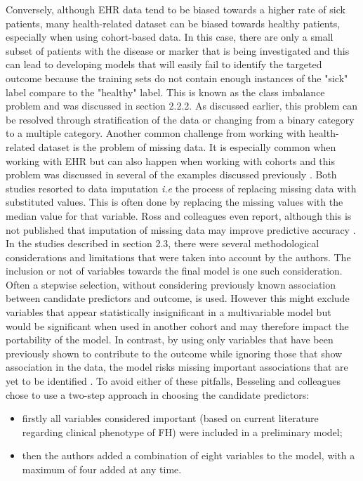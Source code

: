 Conversely, although EHR data tend to be biased towards a higher rate of sick patients, many health-related dataset can be biased towards healthy patients, especially when using cohort-based data. In this case, there are only a small subset of patients with the disease or marker that is being investigated and this can lead to developing models that will easily fail to identify the targeted outcome because the training sets do not contain enough instances of the "sick" label compare to the "healthy" label. This is known as the class imbalance problem and was discussed in section 2.2.2. 
As discussed earlier, this problem can be resolved through stratification of the data or changing from a binary category to a multiple category.
Another common challenge from working with health-related dataset is the problem of missing data. It is especially common when working with EHR \citep{Goldstein:2017bk} but can also happen when working with cohorts and this problem was discussed in several of the examples discussed previously \citep{Besseling:2017bs, Ross:2016kh}.\newline
Both studies resorted to data imputation \textit{i.e} the process of replacing missing data with substituted values. This is often done by replacing the missing values with the median value for that variable. Ross and colleagues even report, although this is not published that imputation of missing data may improve predictive accuracy \citep{Ross:2016kh}.\newline
In the studies described in section 2.3, there were several methodological considerations and limitations that were taken into account by the authors. The inclusion or not of variables towards the final model is one such consideration. Often a stepwise selection, without considering previously known association between candidate predictors and outcome, is used. However this might exclude variables that appear statistically insignificant in a multivariable model but would be significant when used in another cohort and may therefore impact the portability of the model. In contrast, by using only variables that have been previously shown to contribute to the outcome while ignoring those that show association in the data, the model risks missing important associations that are yet to be identified \citep{Besseling:2017bs}. To avoid either of these pitfalls, Besseling and colleagues chose to use a two-step approach in choosing the candidate predictors: 
 \begin{itemize}
 \item firstly all variables considered important (based on current literature regarding clinical phenotype of FH) were included in a preliminary model;
 \item then the authors added a combination of eight variables to the model, with a maximum of four added at any time.
\end{itemize}
